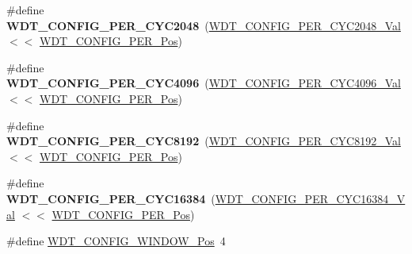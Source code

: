 \begin{DoxyCompactItemize}
\item 
\hypertarget{group___s_a_m_l21___w_d_t_ga211e6e21061c9f388f9836ced858c03c}{}\#define {\bfseries W\+D\+T\+\_\+\+C\+O\+N\+F\+I\+G\+\_\+\+P\+E\+R\+\_\+\+C\+Y\+C2048}~(\hyperlink{group___s_a_m_l21___w_d_t_ga67b3ace504ea66ff9716a81fe4ffa566}{W\+D\+T\+\_\+\+C\+O\+N\+F\+I\+G\+\_\+\+P\+E\+R\+\_\+\+C\+Y\+C2048\+\_\+\+Val}    $<$$<$ \hyperlink{group___s_a_m_l21___w_d_t_ga55662a2fa7e16fd6cc7a5e0800034360}{W\+D\+T\+\_\+\+C\+O\+N\+F\+I\+G\+\_\+\+P\+E\+R\+\_\+\+Pos})\label{group___s_a_m_l21___w_d_t_ga211e6e21061c9f388f9836ced858c03c}

\item 
\hypertarget{group___s_a_m_l21___w_d_t_ga0a96788becd1eccfff01317b078c1e07}{}\#define {\bfseries W\+D\+T\+\_\+\+C\+O\+N\+F\+I\+G\+\_\+\+P\+E\+R\+\_\+\+C\+Y\+C4096}~(\hyperlink{group___s_a_m_l21___w_d_t_ga50edfcd24c0430413186fc6794354abb}{W\+D\+T\+\_\+\+C\+O\+N\+F\+I\+G\+\_\+\+P\+E\+R\+\_\+\+C\+Y\+C4096\+\_\+\+Val}    $<$$<$ \hyperlink{group___s_a_m_l21___w_d_t_ga55662a2fa7e16fd6cc7a5e0800034360}{W\+D\+T\+\_\+\+C\+O\+N\+F\+I\+G\+\_\+\+P\+E\+R\+\_\+\+Pos})\label{group___s_a_m_l21___w_d_t_ga0a96788becd1eccfff01317b078c1e07}

\item 
\hypertarget{group___s_a_m_l21___w_d_t_gab2e86a8c070df0dacdefccdc73fe5123}{}\#define {\bfseries W\+D\+T\+\_\+\+C\+O\+N\+F\+I\+G\+\_\+\+P\+E\+R\+\_\+\+C\+Y\+C8192}~(\hyperlink{group___s_a_m_l21___w_d_t_gad72220cefef593dcdc0c97430cdd381b}{W\+D\+T\+\_\+\+C\+O\+N\+F\+I\+G\+\_\+\+P\+E\+R\+\_\+\+C\+Y\+C8192\+\_\+\+Val}    $<$$<$ \hyperlink{group___s_a_m_l21___w_d_t_ga55662a2fa7e16fd6cc7a5e0800034360}{W\+D\+T\+\_\+\+C\+O\+N\+F\+I\+G\+\_\+\+P\+E\+R\+\_\+\+Pos})\label{group___s_a_m_l21___w_d_t_gab2e86a8c070df0dacdefccdc73fe5123}

\item 
\hypertarget{group___s_a_m_l21___w_d_t_gad9f24226a1ccd62b7e1e46c3c23290d7}{}\#define {\bfseries W\+D\+T\+\_\+\+C\+O\+N\+F\+I\+G\+\_\+\+P\+E\+R\+\_\+\+C\+Y\+C16384}~(\hyperlink{group___s_a_m_l21___w_d_t_ga24efb4b1dd8e5db35e462f94bceaadec}{W\+D\+T\+\_\+\+C\+O\+N\+F\+I\+G\+\_\+\+P\+E\+R\+\_\+\+C\+Y\+C16384\+\_\+\+Val}   $<$$<$ \hyperlink{group___s_a_m_l21___w_d_t_ga55662a2fa7e16fd6cc7a5e0800034360}{W\+D\+T\+\_\+\+C\+O\+N\+F\+I\+G\+\_\+\+P\+E\+R\+\_\+\+Pos})\label{group___s_a_m_l21___w_d_t_gad9f24226a1ccd62b7e1e46c3c23290d7}

\item 
\hypertarget{group___s_a_m_l21___w_d_t_gab2d3263bd9ad06e3257234d9da623ef8}{}\#define \hyperlink{group___s_a_m_l21___w_d_t_gab2d3263bd9ad06e3257234d9da623ef8}{W\+D\+T\+\_\+\+C\+O\+N\+F\+I\+G\+\_\+\+W\+I\+N\+D\+O\+W\+\_\+\+Pos}~4\label{group___s_a_m_l21___w_d_t_gab2d3263bd9ad06e3257234d9da623ef8}


\end{DoxyCompactItemize}
